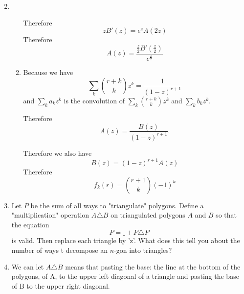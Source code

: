 \documentclass[12pt,a4paper]{article}
\makeatletter
\newtheorem*{solution}{Solution}
\theoremstyle{definition}
\renewenvironment{solution}[1][Solution] {\par\pushQED{\qed}\normalfont\topsep6\p@\@plus6\p@\relax\trivlist\item[\hskip\labelsep\bfseries#1\@addpunct{.}]\ignorespaces}{\popQED\endtrivlist\@endpefalse} \makeatother
\makeatother
\begin{document}
\begin{enumerate}
\begin{solution}
\begin{enumerate}
        		    Therefore
        		    \begin{equation*}
        		        zB'(z)=e^zA(2z)
        		    \end{equation*}
        		    Therefore
        		    \begin{equation*}
        		        A(z)=\frac{\frac{z}{2}B'(\frac{z}{2})}{e^{\frac{z}{2}}}
        		    \end{equation*}
        		\item 
        		    Because we have
        		    \begin{equation*}
        		        \sum_k \binom{r+k}{k}z^k=\frac{1}{(1-z)^{r+1}}
        		    \end{equation*}
        		    and $\sum_k a_kz^k$ is the convolution of $\sum_k \binom{r+k}{k}z^k$ and $\sum_k b_kz^k$.
        		    
        		    Therefore 
        		    \begin{equation*}
        		        A(z)=\frac{B(z)}{(1-z)^{r+1}}.
        		    \end{equation*}
        		    
        		    Therefore we also have
        		    \begin{equation*}
        		        B(z)=(1-z)^{r+1}A(z)
        		    \end{equation*}
        		    Therefore
        		    \begin{equation*}
        		        f_k(r)=\binom{r+1}{k}(-1)^k
        		    \end{equation*}
        	\end{enumerate}
        \end{solution}
    \item 
        Let $P$ be the sum of all ways to "triangulate" polygons. Define a "multiplication" operation $A \triangle B$ on triangulated polygons $A$ and $B$ so that the equation
        \begin{equation*}
            P=\_+P\triangle P
        \end{equation*}
        is valid. Then replace each triangle by 'z'. What does this tell you about the number of ways t decompose an $n$-gon into triangles?
        \begin{solution}
        	We can let $A \triangle B$ means that pasting the base: the line at the bottom of the polygons, of A, to the upper left diagonal of a triangle and pasting the base of B to the upper right diagonal.
        	

\end{solution}
\end{enumerate}
\end{document}
